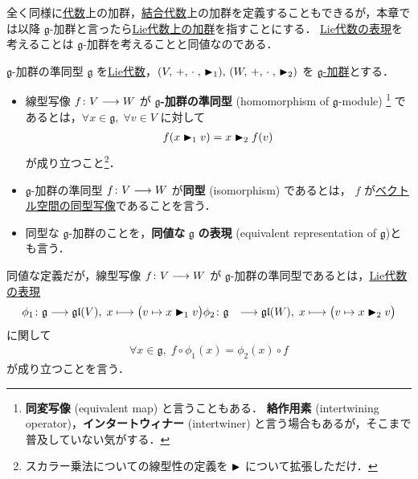 \documentclass[rep_main]{subfiles}
\begin{document}
全く同様に\hyperref[def:Alg]{代数}上の加群，\hyperref[def:Alg]{結合代数}上の加群を定義することもできるが，本章では以降 $\mathfrak{g}$-加群と言ったら\hyperref[ax:g-module]{Lie代数上の加群}を指すことにする．
\hyperref[def:rep-LieAlg]{Lie代数の表現}を考えることは $\mathfrak{g}$-加群を考えることと同値なのである．

\begin{mydef}[label=def:g-module-hom]{$\mathfrak{g}$-加群の準同型}
    $\mathfrak{g}$ を\hyperref[ax:LieAlg]{Lie代数}，$(V,\, +,\, \cdot\;,\, \blacktriangleright_1),\, (W,\, +,\, \cdot\;,\, \blacktriangleright_2)$ を \hyperref[ax:g-module]{ $\mathfrak{g}$-加群}とする．
    \begin{itemize}
		\item 線型写像 $f \colon V \longrightarrow W$ が $\bm{\mathfrak{g}}$\textbf{-加群の準同型} (homomorphism of $\mathfrak{g}$-module)
		\footnote{
			\textbf{同変写像} (equivalent map) と言うこともある．
			\textbf{絡作用素} (intertwining operator)，\textbf{インタートウィナー} (intertwiner) と言う場合もあるが，そこまで普及していない気がする．
		} であるとは，$\forall x \in \mathfrak{g},\; \forall v \in V$ に対して
		\begin{align}
			f(x \blacktriangleright_1 v) = x \blacktriangleright_2 f(v)
		\end{align}
		が成り立つこと\footnote{スカラー乗法についての線型性の定義を $\blacktriangleright$ について拡張しただけ．}．	
        \item $\mathfrak{g}$-加群の準同型 $f \colon V \longrightarrow W$ が\textbf{同型} (isomorphism) であるとは，
        $f$ が\underline{ベクトル空間の同型写像}であることを言う．
        \item 同型な $\mathfrak{g}$-加群のことを，\textbf{同値な} $\bm{\mathfrak{g}}$ \textbf{の表現} (equivalent representation of $\mathfrak{g}$)とも言う．
    \end{itemize}

    \tcblower

	同値な定義だが，線型写像 $f \colon V \longrightarrow W$ が $\mathfrak{g}$-加群の準同型であるとは，\hyperref[def:rep-LieAlg]{Lie代数の表現}
	\begin{align}
		\phi_1 \colon \mathfrak{g} &\longrightarrow \mathfrak{gl} (V),\; x \longmapsto \bigl( v \mapsto x \blacktriangleright_1 v \bigr) 
		\phi_2 \colon \mathfrak{g} &\longrightarrow \mathfrak{gl} (W),\; x \longmapsto \bigl( v \mapsto x \blacktriangleright_2 v \bigr) 
	\end{align}
	に関して
	\begin{align}
		\forall x \in \mathfrak{g},\; f \circ \phi_1(x) = \phi_2(x) \circ f
	\end{align}
	が成り立つことを言う．
\end{mydef}
\end{document}
